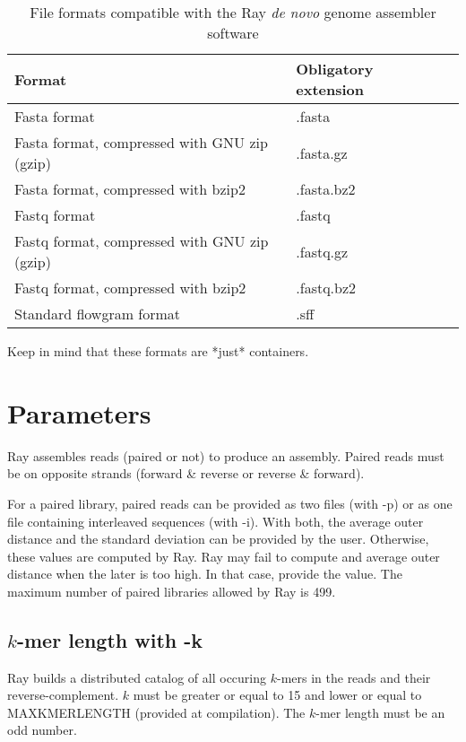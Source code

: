 \documentclass{article}
\begin{document}
\begin{table}[h]
\caption{File formats compatible with the Ray \emph{de novo} genome assembler software}\label{formats}
\begin{tabular}{lll}
\hline
Format & Obligatory extension \\
\hline
Fasta format & .fasta\\
Fasta format, compressed with GNU zip (gzip) & .fasta.gz \\
Fasta format, compressed with bzip2 & .fasta.bz2 \\
Fastq format & .fastq\\
Fastq format, compressed with GNU zip (gzip) & .fastq.gz \\
Fastq format, compressed with bzip2 & .fastq.bz2 \\
Standard flowgram format & .sff \\
\hline
\end{tabular}
\end{table}

Keep in mind that these formats are *just* containers.


\section{Parameters}

Ray assembles reads (paired or not) to produce an assembly.
Paired reads must be on opposite strands (forward \& reverse or reverse \& forward).

For a paired library, paired reads can be provided as two files (with -p) or as one file containing interleaved
sequences (with -i).
With both, the average outer distance and the standard deviation can be provided by the user. Otherwise, these values are
computed by Ray. Ray may fail to compute and average outer distance when the later is too high.
In that case, provide the value.
The maximum  number of paired libraries allowed by Ray is 499.




\subsection{$k$-mer length with -k}

Ray builds a distributed catalog of all occuring $k$-mers in the reads and their reverse-complement. $k$ must be greater or equal to 15 and lower or equal to MAXKMERLENGTH (provided at compilation). The $k$-mer length must be an odd number.
\end{document}
